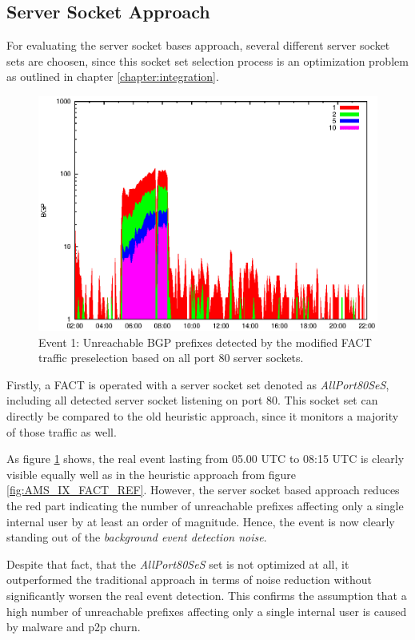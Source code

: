 \subsection{Server Socket Approach}
For evaluating the server socket bases approach, several different server socket sets are choosen, since this socket set selection process is an optimization problem as outlined in chapter \ref{chapter:integration}.

\begin{figure}
	[p] \centering 
	\includegraphics[width=0.75\linewidth]{images/events/2010_03_25/bgp_log_allPort80SES.eps}
	\caption{Event 1: Unreachable BGP prefixes detected by the modified FACT traffic preselection based on all port 80 server sockets.} 
	\label{fig:AMS_IX_FACT_allSES80} 
\end{figure}

Firstly, a FACT is operated with a server socket set denoted as \emph{AllPort80SeS}, including all detected server socket listening on port 80. This socket set can directly be compared to the old heuristic approach, since it monitors a majority of those traffic as well. 

As figure \ref{fig:AMS_IX_FACT_allSES80} shows, the real event lasting from 05.00 UTC to 08:15 UTC is clearly visible equally well as in the heuristic approach from figure \ref{fig:AMS_IX_FACT_REF}. However, the server socket based approach reduces the red part indicating the number of unreachable prefixes affecting only a single internal user by at least an order of magnitude. Hence,  the event is now clearly standing out of the \emph{background event detection noise}.

Despite that fact, that the \emph{AllPort80SeS} set is not optimized at all, it outperformed the traditional approach in terms of noise reduction without significantly worsen the real event detection. This confirms the assumption that a high number of unreachable prefixes affecting only a single internal user is caused by malware and p2p churn.

